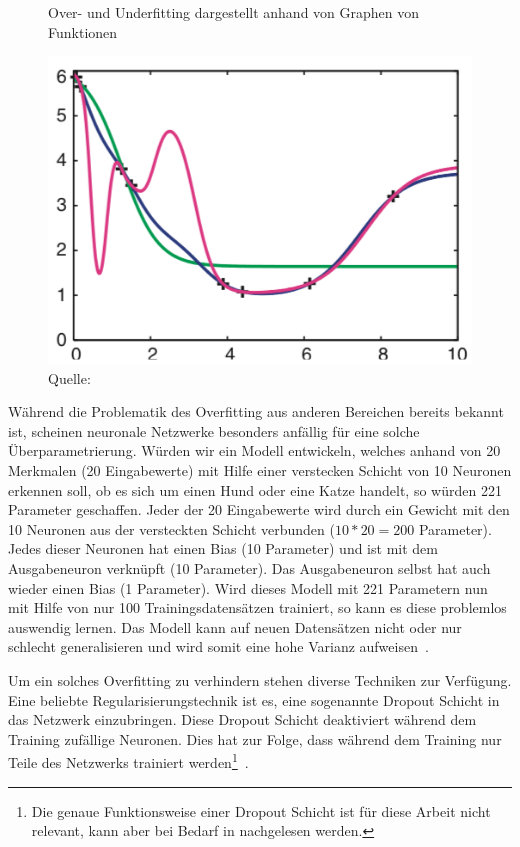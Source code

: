 \begin{figure}[h!]
    \captionsetup{width=.9\linewidth}
    \caption{Over- und Underfitting dargestellt anhand von Graphen von Funktionen}
    \label{krogh:d}
    \centering
    \includegraphics[width=0.5\linewidth]{graphics/krogh/krogh_overfitting.png}
    \vspace*{0.2cm}
    \caption*{Quelle: \textcite{Krogh2008}}
\end{figure}

Während die Problematik des Overfitting aus anderen Bereichen bereits bekannt ist, scheinen neuronale Netzwerke besonders anfällig für eine solche Überparametrierung. Würden wir ein Modell entwickeln, welches anhand von 20 Merkmalen (20 Eingabewerte) mit Hilfe einer verstecken Schicht von 10 Neuronen erkennen soll, ob es sich um einen Hund oder eine Katze handelt, so würden 221 Parameter geschaffen. Jeder der 20 Eingabewerte wird durch ein Gewicht mit den 10 Neuronen aus der versteckten Schicht verbunden ($10 * 20 = 200$ Parameter). Jedes dieser Neuronen hat einen Bias (10 Parameter) und ist mit dem Ausgabeneuron verknüpft (10 Parameter). Das Ausgabeneuron selbst hat auch wieder einen Bias (1 Parameter). Wird dieses Modell mit 221 Parametern nun mit Hilfe von nur 100 Trainingsdatensätzen trainiert, so kann es diese problemlos auswendig lernen. Das Modell kann auf neuen Datensätzen nicht oder nur schlecht generalisieren und wird somit eine hohe Varianz aufweisen~\autocite{Krogh2008}.

Um ein solches Overfitting zu verhindern stehen diverse Techniken zur Verfügung. Eine beliebte Regularisierungstechnik ist es, eine sogenannte Dropout Schicht in das Netzwerk einzubringen. Diese Dropout Schicht deaktiviert während dem Training zufällige Neuronen. Dies hat zur Folge, dass während dem Training nur Teile des Netzwerks trainiert werden\footnote{Die genaue Funktionsweise einer Dropout Schicht ist für diese Arbeit nicht relevant, kann aber bei Bedarf in \textcite{Goodfellow2016} nachgelesen werden.}~\autocite{Goodfellow2016}.

